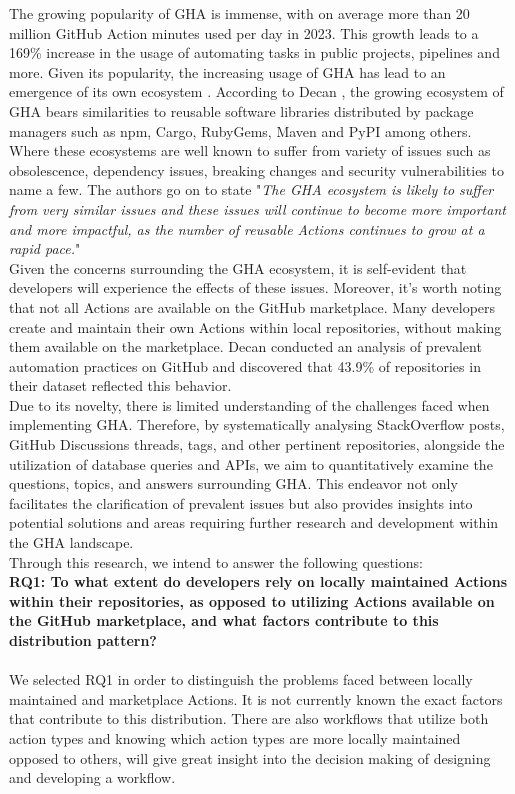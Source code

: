 \documentclass[conference]{IEEEtran}
\begin{document}
    The growing popularity of GHA is immense, with on average more than 20 million GitHub Action minutes used per day in 2023. This growth leads to a 169\% increase in the usage of automating tasks in public projects,  pipelines and more\cite{github2023octoverse}. Given its popularity,  the increasing usage of GHA has lead to an emergence of its own ecosystem \cite{decan2022use}.  According to Decan \cite{decan2022use}, the growing ecosystem of GHA bears similarities to reusable software libraries distributed by package managers such as npm, Cargo, RubyGems, Maven and PyPI among others. Where these ecosystems are well known to suffer from variety of issues such as obsolescence, dependency issues, breaking changes and security vulnerabilities to name a few\cite{decan2022use}. The authors go on to state "\textit{The GHA ecosystem is likely to suffer from very similar issues and these issues will continue to become more important and more impactful, as the number of reusable Actions continues to grow at a rapid pace.}"\\

    Given the concerns surrounding the GHA ecosystem, it is self-evident that developers will experience the effects of these issues.  Moreover, it's worth noting that not all Actions are available on the GitHub marketplace. Many developers create and maintain their own Actions within local repositories, without making them available on the marketplace. Decan \cite{decan2022use} conducted an analysis of prevalent automation practices on GitHub and discovered that 43.9\% of repositories in their dataset reflected this behavior.\\

    Due to its novelty, there is limited understanding of the challenges faced when implementing GHA.  
    Therefore,  by systematically analysing StackOverflow posts, GitHub Discussions threads, tags, and other pertinent repositories, alongside the utilization of database queries and APIs, we aim to quantitatively examine the questions, topics, and answers surrounding GHA. This endeavor not only facilitates the clarification of prevalent issues but also provides insights into potential solutions and areas requiring further research and development within the GHA landscape.\\

    Through this research, we intend to answer the following questions:\\


     \textbf{RQ1: To what extent do developers rely on locally maintained Actions within their repositories, as opposed to utilizing Actions available on the GitHub marketplace, and what factors contribute to this distribution pattern?}\\\\
        We selected RQ1 in order to distinguish the problems faced between locally maintained and marketplace Actions. It is not currently known the exact factors that contribute to this distribution. There are also workflows that utilize both action types and knowing which action types are more locally maintained opposed to others, will give great insight into the decision making of designing and developing a workflow. \\
\end{document}
